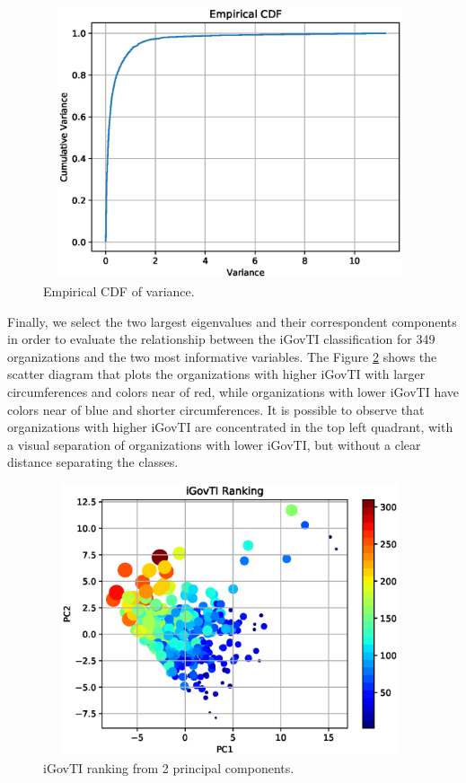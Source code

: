\begin{figure}[h!]
     \centering 
     \includegraphics[height=8cm, width=11cm]{figs/b_csf_pca_svm/raw_variance_ecdf.eps}
     \caption{Empirical CDF of variance.}
     \label{fig:ch2_fig2}
\end{figure}
 
Finally, we select the two largest eigenvalues and their correspondent components in order to evaluate the relationship between the iGovTI classification for 349 organizations and the two most informative variables. The Figure \ref{fig:ch2_fig3} shows the scatter diagram that plots the organizations with higher iGovTI with larger circumferences and colors near of red, while organizations with lower iGovTI have colors near of blue and shorter circumferences. It is possible to observe that organizations with higher iGovTI are concentrated in the top left quadrant, with a visual separation of organizations with lower iGovTI, but without a clear distance separating the classes.
 
\begin{figure}[h!]
     \centering 
     \includegraphics[height=8cm, width=11cm]{figs/b_csf_pca_svm/raw_igovti_ranking_pc2.eps}
     \caption{iGovTI ranking from 2 principal components.}
     \label{fig:ch2_fig3}
\end{figure}

